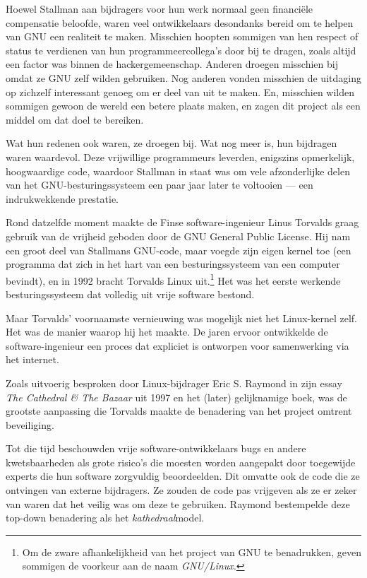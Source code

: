 \documentclass[
  a5paper,
  smalldemyvopaper,11pt,twoside,onecolumn,openright,extrafontsizes,
hidelinks]{memoir}
\begin{document}
Hoewel Stallman aan bijdragers voor hun werk normaal geen financiële
compensatie beloofde, waren veel ontwikkelaars desondanks bereid om te
helpen van GNU een realiteit te maken. Misschien hoopten sommigen van
hen respect of status te verdienen van hun programmeercollega's door bij
te dragen, zoals altijd een factor was binnen de hackergemeenschap.
Anderen droegen misschien bij omdat ze GNU zelf wilden gebruiken. Nog
anderen vonden misschien de uitdaging op zichzelf interessant genoeg om
er deel van uit te maken. En, misschien wilden sommigen gewoon de wereld
een betere plaats maken, en zagen dit project als een middel om dat doel
te bereiken.

Wat hun redenen ook waren, ze droegen bij. Wat nog meer is, hun
bijdragen waren waardevol. Deze vrijwillige programmeurs leverden,
enigszins opmerkelijk, hoogwaardige code, waardoor Stallman in staat was
om vele afzonderlijke delen van het GNU-besturingssysteem een paar jaar
later te voltooien --- een indrukwekkende prestatie.

Rond datzelfde moment maakte de Finse software-ingenieur Linus Torvalds
graag gebruik van de vrijheid geboden door de GNU General Public
License. Hij nam een groot deel van Stallmans GNU-code, maar voegde zijn
eigen kernel toe (een programma dat zich in het hart van een
besturingssysteem van een computer bevindt), en in 1992 bracht Torvalds
Linux uit.\footnote{Om de zware afhankelijkheid van het project van GNU
  te benadrukken, geven sommigen de voorkeur aan de naam
  \emph{GNU/Linux}.} Het was het eerste werkende besturingssysteem dat
volledig uit vrije software bestond.

Maar Torvalds' voornaamste vernieuwing was mogelijk niet het
Linux-kernel zelf. Het was de manier waarop hij het maakte. De jaren
ervoor ontwikkelde de software-ingenieur een proces dat expliciet is
ontworpen voor samenwerking via het internet.

Zoals uitvoerig besproken door Linux-bijdrager Eric S. Raymond in zijn
essay \emph{The Cathedral \& The Bazaar} uit 1997 en het (later)
gelijknamige boek, was de grootste aanpassing die Torvalds maakte de
benadering van het project omtrent beveiliging.

Tot die tijd beschouwden vrije software-ontwikkelaars bugs en andere
kwetsbaarheden als grote risico's die moesten worden aangepakt door
toegewijde experts die hun software zorgvuldig beoordeelden. Dit omvatte
ook de code die ze ontvingen van externe bijdragers. Ze zouden de code
pas vrijgeven als ze er zeker van waren dat het veilig was om deze te
gebruiken. Raymond bestempelde deze top-down benadering als het
\emph{kathedraal}model.
\end{document}
